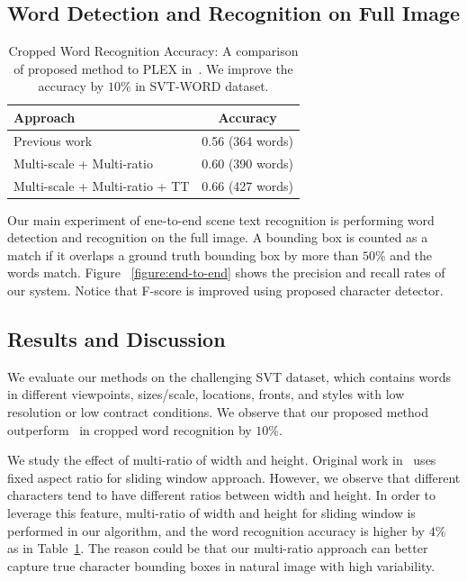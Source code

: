 \documentclass[10pt,twocolumn,letterpaper]{article}
\begin{document}
\subsection{Word Detection and Recognition on Full Image}

\begin{table}
\begin{center}
\begin{tabular}{|l|c|}
\hline
Approach & Accuracy \\
\hline\hline
Previous work~\cite{417}  & 0.56 (364 words) \\
Multi-scale + Multi-ratio & 0.60 (390 words)\\
Multi-scale + Multi-ratio + TT & 0.66 (427 words)\\
\hline
\end{tabular}
\end{center}
\caption{Cropped Word Recognition Accuracy: A comparison of proposed method to PLEX in~\cite{417}. We improve the accuracy by $10\%$ in SVT-WORD dataset.}
\label{table:compare}
\end{table}

Our main experiment of ene-to-end scene text recognition is performing word detection and recognition on the full image. A bounding box is counted as a match if it overlaps a ground truth bounding box by more than $50\%$ and the words match. Figure ~\ref{figure:end-to-end} shows the precision and recall rates of our system. Notice that F-score is improved using proposed character detector.

\subsection{Results and Discussion}

We evaluate our methods on the challenging SVT dataset, which contains words in different viewpoints, sizes/scale, locations, fronts, and styles with low resolution or low contract conditions. We observe that our proposed method outperform~\cite{117} in cropped word recognition by $10\%$.

We study the effect of multi-ratio of width and height. Original work in~\cite{417} uses fixed aspect ratio for sliding window approach. However, we observe that different characters tend to have different ratios between width and height. In order to leverage this feature, multi-ratio of width and height for sliding window is performed in our algorithm, and the word recognition accuracy is higher by $4\%$ as in Table~\ref{table:compare}. The reason could be that our multi-ratio approach can better capture true character bounding boxes in natural image with high variability.
\end{document}
